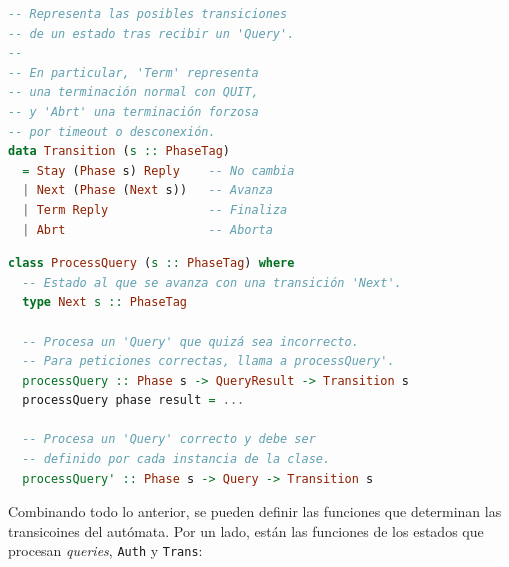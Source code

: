 \documentclass[a4paper]{CSMakotoTechnicalReport}
\begin{document}
\vspace{-20pt}
\begin{minipage}[t]{0.40\textwidth}
\begin{lstlisting}[language=Haskell, frame=none, numbers=none, basicstyle=\footnotesize]
-- Representa las posibles transiciones
-- de un estado tras recibir un 'Query'.
--
-- En particular, 'Term' representa
-- una terminación normal con QUIT,
-- y 'Abrt' una terminación forzosa
-- por timeout o desconexión.
data Transition (s :: PhaseTag)
  = Stay (Phase s) Reply    -- No cambia
  | Next (Phase (Next s))   -- Avanza
  | Term Reply              -- Finaliza
  | Abrt                    -- Aborta
\end{lstlisting}
\vspace{-4pt}
\captionsetup{type=lstlisting}
\caption{Definición de Transition.}
\end{minipage}
\hfill
\begin{minipage}[t]{0.55\textwidth}
\begin{lstlisting}[language=Haskell, frame=none, numbers=none, basicstyle=\footnotesize]
class ProcessQuery (s :: PhaseTag) where
  -- Estado al que se avanza con una transición 'Next'.
  type Next s :: PhaseTag

  -- Procesa un 'Query' que quizá sea incorrecto.
  -- Para peticiones correctas, llama a processQuery'.
  processQuery :: Phase s -> QueryResult -> Transition s
  processQuery phase result = ...

  -- Procesa un 'Query' correcto y debe ser
  -- definido por cada instancia de la clase.
  processQuery' :: Phase s -> Query -> Transition s
\end{lstlisting}
\vspace{-4pt}
\captionsetup{type=lstlisting}
\caption{Clase ProcessQuery, implementada por Auth y Trans.}
\end{minipage}
\vspace{6pt}

Combinando todo lo anterior, se pueden definir las funciones que determinan las transicoines del autómata. Por un lado, están las funciones de los estados que procesan \textit{queries}, \texttt{Auth} y \texttt{Trans}:
\end{document}
